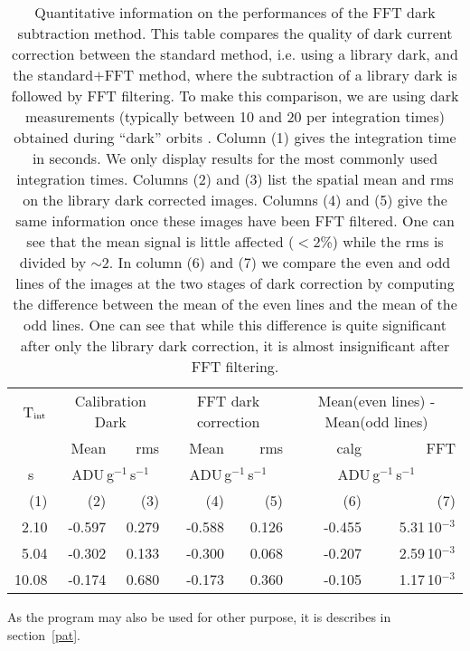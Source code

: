 {\tiny
\begin{table}
\begin{tabular}{r|rr|rr||rr}
\hline
T$_{\rm int}$ & \multicolumn{2}{c|}{{\small Calibration Dark}} & \multicolumn{2}{c||}{{\small FFT dark correction}} & \multicolumn{2}{c}{{\small Mean(even lines) - Mean(odd lines)}} \\
 & Mean & rms & Mean & rms & calg & FFT \\
\multicolumn{1}{c|}{s} & \multicolumn{2}{c|}{ADU\,g$^{-1}$\,s$^{-1}$} & \multicolumn{2}{c||}{ADU\,g$^{-1}$\,s$^{-1}$} & \multicolumn{2}{c}{ADU\,g$^{-1}$\,s$^{-1}$} \\
(1) & (2) & (3) & (4) & (5) & (6) & (7) \\
\hline 
2.10 &  -0.597 & 0.279 & -0.588 & 0.126 & -0.455 & 5.31\,10$^{-3}$ \\
5.04 &  -0.302 & 0.133 & -0.300 & 0.068 & -0.207 & 2.59\,10$^{-3}$ \\
10.08 & -0.174 & 0.680 & -0.173 & 0.360 & -0.105 & 1.17\,10$^{-3}$ \\
\end{tabular}

\caption{Quantitative information on the performances of the FFT dark
subtraction method. This table compares the quality of dark current
correction between the standard method, i.e. using a library dark, and
the standard$+$FFT method, where the subtraction of a library dark is
followed by FFT filtering. To make this comparison, we are using dark
measurements (typically between 10 and 20 per integration times)
obtained during ``dark'' orbits \cite{iso:biviano98}. Column (1)
gives the integration time in seconds. We only display results for the
most commonly used integration times. Columns (2) and (3) list the spatial
mean and rms on the library dark corrected images. Columns (4) and (5)
give the same information once these images have been FFT
filtered. One can see that the mean signal is little affected ($<$2\%)
while the rms is divided by $\sim$2. In column (6) and (7) we compare
the even and odd lines of the images at the two stages of dark
correction by computing the difference between the mean of the even
lines and the mean of the odd lines. One can see that while this
difference is quite significant after only the library dark
correction, it is almost insignificant after FFT filtering.}

\label{tab:sdk}
\end{table}
}


As the program may also be used for other purpose, it is describes in
section~\ref{pat}.

